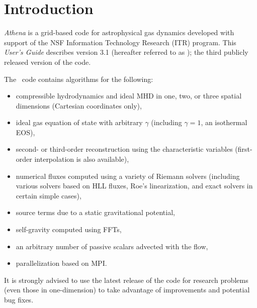 \section{Introduction}

{\it Athena} is a grid-based code for astrophysical gas dynamics
developed with support of the NSF Information Technology Research (ITR)
program.  This {\it User's Guide} describes version 3.1 (hereafter
referred to as \ath); the third publicly released version of the code.

The \ath\ code contains algorithms for the following:
\begin{itemize}

\item compressible hydrodynamics and ideal MHD in one, two, or three spatial dimensions (Cartesian coordinates only),

\item ideal gas equation of state with arbitrary $\gamma$ (including 
$\gamma = 1$, an isothermal EOS),

\item second- or third-order reconstruction using the characteristic variables
(first-order interpolation is also available),

\item numerical fluxes computed using a variety of Riemann solvers (including
various solvers based on HLL fluxes, Roe's linearization, and exact solvers
in certain simple cases),

\item source terms due to a static gravitational potential,

\item self-gravity computed using FFTs,

\item an arbitrary number of passive scalars advected with the flow,

\item parallelization based on MPI.

\end{itemize}
It is strongly advised to use the latest release of
the code for research problems (even those in one-dimension) to take
advantage of improvements and potential bug fixes.

